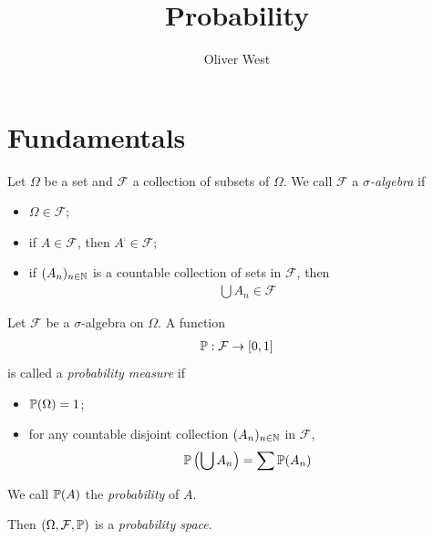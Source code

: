 \documentclass{../../template/note}
\author{Oliver West}
\title{Probability}
\date{}
\begin{document}
    \maketitle

    \tableofcontents


    \section{Fundamentals}

    \begin{definition}
        Let \(\Omega\) be a set and \(\mathcal F\) a collection of subsets of \(\Omega\). We call \(\mathcal F\) a \emph{\(\sigma\)-algebra} if
        \begin{itemize}
            \item \(\Omega \in \mathcal F\);
            \item if \(A \in \mathcal F\), then \(A^\comp \in \mathcal F\);
            \item if \((A_n)_{n \in \mathbb N}\) is a countable collection of sets in \(\mathcal F\), then
            \begin{align*}
                \bigcup A_n \in \mathcal F
            \end{align*}
        \end{itemize}
    \end{definition}
    
    \begin{definition}
        Let \(\mathcal F\) be a \(\sigma\)-algebra on \(\Omega\). A function
        \begin{align*}
            \mathbb P: \mathcal F \to [0, 1]
        \end{align*}
        is called a \emph{probability measure} if
        \begin{itemize}
            \item \(\mathbb P(\Omega) = 1\);
            \item for any countable disjoint collection \((A_n)_{n \in \mathbb N}\) in \(\mathcal F\),
            \begin{align*}
                \mathbb P \left(\bigcup A_n\right) = \sum \mathbb P(A_n)
            \end{align*}
        \end{itemize}
        We call \(\mathbb P(A)\) the \emph{probability} of \(A\).
    \end{definition}
    
    Then \((\Omega, \mathcal F, \mathbb P)\) is a \emph{probability space}.
    
\end{document}
